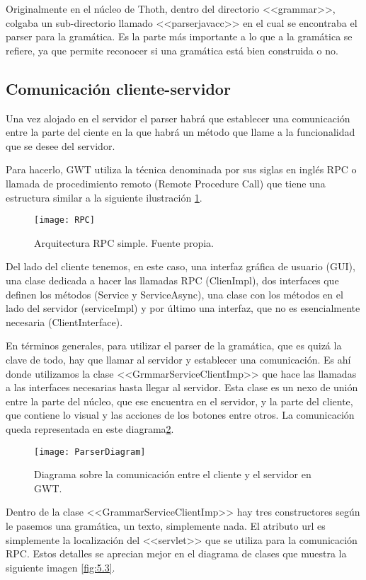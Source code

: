Originalmente en el núcleo de Thoth, dentro del directorio <<grammar>>, colgaba un sub-directorio llamado <<parserjavacc>> en el cual se encontraba el parser para la gramática. Es la parte más importante a lo que a la gramática se refiere, ya que permite reconocer si una gramática está bien construida o no.


\subsection{Comunicación cliente-servidor}
Una vez alojado en el servidor el parser habrá que establecer una comunicación entre la parte del ciente en la que habrá un método que llame a la funcionalidad que se desee del servidor.

Para hacerlo, GWT utiliza la técnica denominada por sus siglas en inglés RPC o llamada de procedimiento remoto (Remote Procedure Call) que tiene una estructura similar a la siguiente ilustración \ref{fig:5.1}.

\begin{figure}[h]
\centering
\texttt{[image: RPC]}
\caption{Arquitectura RPC simple. Fuente propia.}
\label{fig:5.1}
\end{figure}

Del lado del cliente tenemos, en este caso, una interfaz gráfica de usuario (GUI), una clase dedicada a hacer las llamadas RPC (ClienImpl), dos interfaces que definen los métodos (Service y ServiceAsync), una clase con los métodos en el lado del servidor (serviceImpl) y por último una interfaz, que no es esencialmente necesaria (ClientInterface). 

En términos generales, para utilizar el parser de la gramática, que es quizá la clave de todo, hay que llamar al servidor y establecer una comunicación. Es ahí donde utilizamos la clase <<GrmmarServiceClientImp>> que hace las llamadas a las interfaces necesarias hasta llegar al servidor. Esta clase es un nexo de unión entre la parte del núcleo, que ese encuentra en el servidor, y la parte del cliente, que contiene lo visual y las acciones de los botones entre otros. La comunicación queda representada en este diagrama\ref{fig:5.2}.

\begin{figure}[h]
\centering
\texttt{[image: ParserDiagram]}
\caption{Diagrama sobre la comunicación entre el cliente y el servidor en GWT.}
\label{fig:5.2}
\end{figure}

Dentro de la clase <<GrammarServiceClientImp>> hay tres constructores según le pasemos una gramática, un texto, simplemente nada. El atributo url es simplemente la localización del <<servlet>> que se utiliza para la comunicación RPC. Estos detalles se aprecian mejor en el diagrama de clases que muestra la siguiente imagen \ref{fig:5.3}.

